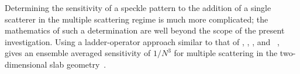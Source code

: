 Determining the sensitivity of a speckle pattern to the addition of a single
scatterer in the multiple scattering regime is much more complicated; the
mathematics of such a determination are well beyond the scope of the present
investigation.  Using a ladder-operator approach similar to that of
, , , and
~\cite{feng1986sensitivity},
~\cite{berkovits1991sensitivity} gives an ensemble averaged
sensitivity of $1/N^3$ for multiple scattering in the two-dimensional slab
geometry~\cite{nieuwenhuizen1993role}.

